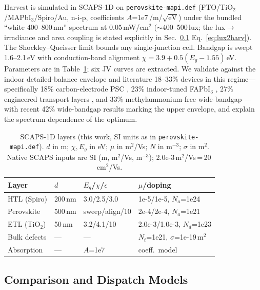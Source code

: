\documentclass[10pt, conference, letterpaper]{IEEEtran}
\begin{document}
Harvest is simulated in SCAPS-1D \cite{burgelman2000} on \texttt{perovskite-mapi.def} (FTO/TiO$_2$/MAPbI$_3$/Spiro/Au, n-i-p, coefficients $A$=1e7\,/m/$\sqrt{\mathrm{eV}}$) under the bundled ``white 400--800\,nm'' spectrum at 0.05\,mW/cm$^2$ ($\sim$400--500\,lux; the lux$\rightarrow$irradiance and area coupling is stated explicitly in Sec.~\ref{sec:comparison} Eq.~\ref{eq:lux2harv}). The Shockley--Queisser limit \cite{shockley1961detailed,freunek2013indoor} bounds any single-junction cell. Bandgap is swept 1.6--2.1\,eV with conduction-band alignment $\chi=3.9+0.5(E_g-1.55)$\,eV. Parameters are in Table~\ref{tab:scapsparams}; six JV curves are extracted. We validate against the indoor detailed-balance envelope and literature 18--33\% devices in this regime---specifically 18\% carbon-electrode PSC \cite{makming2025cnt}, 23\% indoor-tuned FAPbI$_3$ \cite{marrugat2025tuning}, 27\% engineered transport layers \cite{datt2024engineered}, and 33\% methylammonium-free wide-bandgap \cite{shi2025enabling}---with recent 42\% wide-bandgap results \cite{chen2024indoor42,ma2024record} marking the upper envelope, and explain the spectrum dependence of the optimum.

\begin{table}[t]
\centering
\caption{SCAPS-1D layers (this work, SI units as in \texttt{perovskite-mapi.def}). $d$ in m; $\chi,E_g$ in eV; $\mu$ in m$^2$\!/Vs; $N$ in m$^{-3}$; $\sigma$ in m$^2$. Native SCAPS inputs are SI (m, m$^2$\!/Vs, m$^{-3}$); 2.0e-3\,m$^2$\!/Vs\,=\,20\,cm$^2$\!/Vs.}
\label{tab:scapsparams}
{\footnotesize\setlength{\tabcolsep}{3pt}
\begin{tabular}{l l l l}
\toprule
Layer & $d$ & $E_g$/$\chi$/$\epsilon$ & $\mu$/doping \\
\midrule
HTL (Spiro) & 200\,nm & 3.0/2.5/3.0 & 1e-5/1e-5, $N_a$=1e24 \\
Perovskite & 500\,nm & sweep/align/10 & 2e-4/2e-4, $N_a$=1e21 \\
ETL (TiO$_2$) & 50\,nm & 3.2/4.1/10 & 2.0e-3/1.0e-3, $N_d$=1e23 \\
Bulk defects & --- & --- & $N_t$=1e21, $\sigma$=1e-19\,m$^2$ \\
Absorption & --- & $A$=1e7 & coeff.\ model \\
\bottomrule
\end{tabular}}
\end{table}

\subsection{Comparison and Dispatch Models}
\label{sec:comparison}
\end{document}
